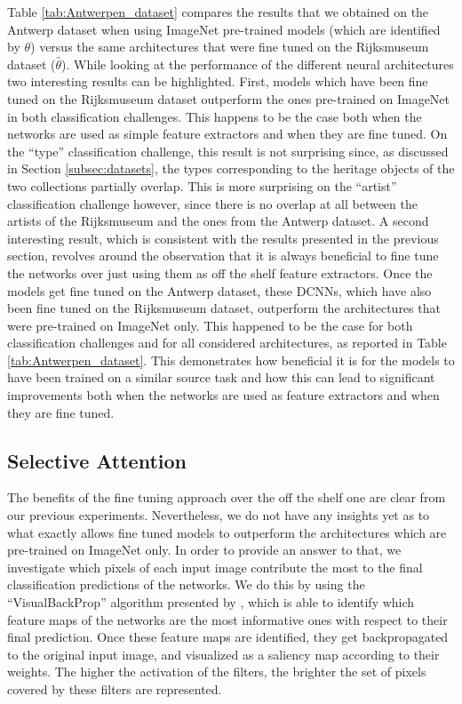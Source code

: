 Table \ref{tab:Antwerpen_dataset} compares the results that we obtained on the Antwerp dataset when using ImageNet pre-trained models (which are identified by $\theta$) versus the same architectures that were fine tuned on the Rijksmuseum dataset ($\widehat{\theta}$). While looking at the performance of the different neural architectures two interesting results can be highlighted. First, models which have been fine tuned on the Rijksmuseum dataset outperform the ones pre-trained on ImageNet in both classification challenges. This happens to be the case both when the networks are used as simple feature extractors and when they are fine tuned. On the ``type'' classification challenge, this result is not surprising since, as discussed in Section \ref{subsec:datasets}, the types corresponding to the heritage objects of the two collections partially overlap. This is more surprising on the ``artist'' classification challenge however, since there is no overlap at all between the artists of the Rijksmuseum and the ones from the Antwerp dataset.
A second interesting result, which is consistent with the results presented in the previous section, revolves around the observation that it is always beneficial to fine tune the networks over just using them as off the shelf feature extractors. Once the models get fine tuned on the Antwerp dataset, these DCNNs, which have also been fine tuned on the Rijksmuseum dataset, outperform the architectures that were pre-trained on ImageNet only. This happened to be the case for both classification challenges and for all considered architectures, as reported in Table \ref{tab:Antwerpen_dataset}. This demonstrates how beneficial it is for the models to have been trained on a similar source task and how this can lead to significant improvements both when the networks are used as feature extractors and when they are fine tuned. 



\subsection{Selective Attention}

The benefits of the fine tuning approach over the off the shelf one are clear from our previous experiments. Nevertheless, we do not have any insights yet as to what exactly allows fine tuned models to outperform the architectures which are pre-trained on ImageNet only. In order to provide an answer to that, we investigate which pixels of each input image contribute the most to the final classification predictions of the networks. We do this by using the ``VisualBackProp'' algorithm presented by \cite{bojarski2016visualbackprop}, which is able to identify which feature maps of the networks are the most informative ones with respect to their final prediction. Once these feature maps are identified, they get backpropagated to the original input image, and visualized as a saliency map according to their weights. The higher the activation of the filters, the brighter the set of pixels covered by these filters are represented.

